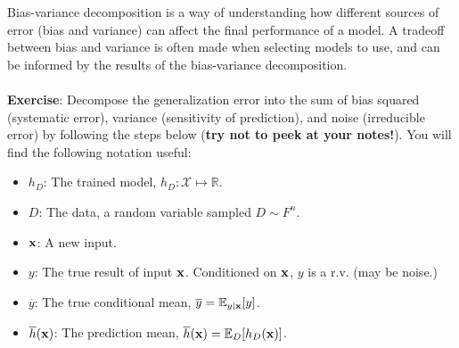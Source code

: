 \documentclass[12pt,letterpaper]{article}
\begin{document}
Bias-variance decomposition is a way of understanding how different sources of error (bias and variance) can affect the final performance of a model. A tradeoff between bias and variance is often made when selecting models to use, and can be informed by the results of the bias-variance decomposition.
\\ \\
\noindent \textbf{Exercise}: Decompose the generalization error into the sum of bias squared (systematic error), variance (sensitivity of prediction), and noise (irreducible error) by following the steps below (\textbf{try not to peek at your notes!}). You will find the following notation useful:
\begin{itemize}
  \item $h_D$: The trained model, $h_D: \mathcal{X} \mapsto \mathbb{R}$.
  \item $D$: The data, a random variable sampled $D\sim F^n$.
  \item $\mathbf{x}$: A new input.
  \item $y$: The true result of input $\mathbf{x}$. Conditioned on $\mathbf{x}$, $y$ is a r.v.
  (may be noise.)
  \item $\overline{y}$: The true conditional mean, $\overline{y}=\mathbb{E}_{y|\mathbf{x}}[y]$.
  \item $\overline{h}(\mathbf{x})$: The prediction mean, $\overline{h}(\mathbf{x})=\mathbb{E}_D[h_D(\mathbf{x})]$.
\end{itemize}
\end{document}
